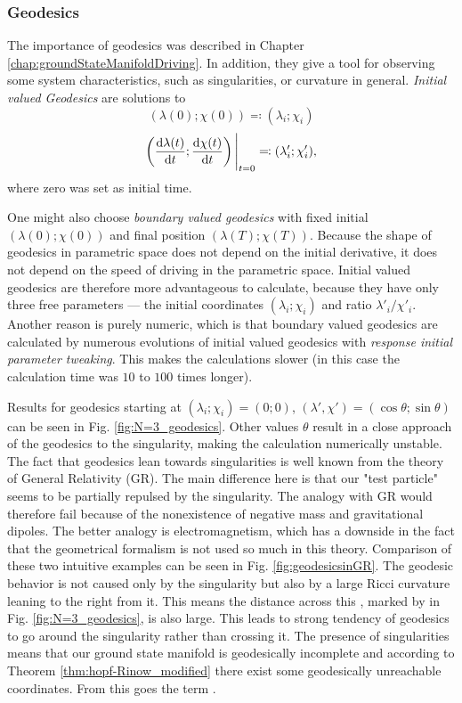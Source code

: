 \subsubsection{Geodesics}
The importance of geodesics was described in Chapter \ref{chap:groundStateManifoldDriving}. In addition, they give a tool for observing some system characteristics, such as singularities, or curvature in general. \emph{Initial valued Geodesics} are solutions to
$$(\lambda(0);\chi(0))\eqqcolon (\lambda_i;\chi_i)$$
$$\left(\frac{\mathrm{d} \lambda(t)}{\mathrm{d} t};\frac{\mathrm{d} \chi(t)}{\mathrm{d} t}\right)\Bigg|_{t=0} \eqqcolon (\lambda'_i;\chi'_i),$$
where zero was set as initial time.

One might also choose \emph{boundary valued geodesics} with fixed initial $(\lambda(0);\chi(0))$ and final position $(\lambda(T);\chi(T))$. Because the shape of geodesics in parametric space does not depend on the initial derivative, it does not depend on the speed of driving in the parametric space. Initial valued geodesics are therefore more advantageous to calculate, because they have only three free parameters — the initial coordinates $(\lambda_i;\chi_i)$ and ratio $\lambda'_i/\chi'_i$. Another reason is purely numeric, which is that boundary valued geodesics are calculated by numerous evolutions of initial valued geodesics with \emph{response initial parameter tweaking}. This makes the calculations slower (in this case the calculation time was $10$ to $100$ times longer).

Results for geodesics starting at $(\lambda_i;\chi_i)=(0;0)$, $
(\lambda',\chi')=(\cos\theta;\sin\theta)$ can be seen in Fig. \ref{fig:N=3_geodesics}. Other values $\theta$ result in a close approach of the geodesics to the singularity, making the calculation numerically unstable. The fact that geodesics lean towards singularities is well known from the theory of General Relativity (GR). The main difference here is that our "test particle" seems to be partially repulsed by the singularity. The analogy with GR would therefore fail because of the nonexistence of negative mass and gravitational dipoles. The better analogy is electromagnetism, which has a downside in the fact that the geometrical formalism is not used so much in this theory. Comparison of these two intuitive examples can be seen in Fig. \ref{fig:geodesicsinGR}. The geodesic behavior is not caused only by the singularity but also by a large Ricci curvature leaning to the right from it. This means the distance across this \emph{}, marked by  in Fig. \ref{fig:N=3_geodesics}, is also large. This leads to strong tendency of geodesics to go around the singularity rather than crossing it. The presence of singularities means that our ground state manifold is geodesically incomplete and according to Theorem \ref{thm:hopf-Rinow_modified} there exist some geodesically unreachable coordinates. From this goes the term \emph{}.

